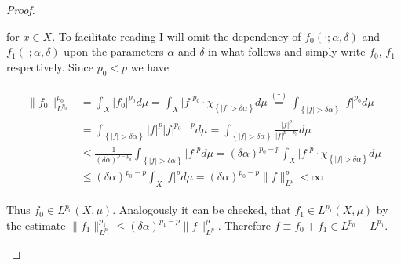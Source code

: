 \begin{proof}
\begin{enumerate}[label = \textbf{(\roman*.)}]
\begin{enumerate}[label = \textbf{\alph*.}]
	for $x \in X$. To facilitate reading I will omit the dependency of $f_0(\cdot;\alpha,\delta)$ and $f_1(\cdot;\alpha,\delta)$ upon the parameters $\alpha$ and $\delta$ in what follows and simply write $f_0$, $f_1$ respectively. Since $p_0 < p$ we have 

	\begin{gather}
		\begin{aligned}
			\|f_0\|^{p_0}_{L^{p_0}} &= \int_{X} \vert f_0\vert^{p_0} d\mu =\int_{X} \vert f \vert^{p_0} \cdot \chi_{\left\{\vert f\vert > \delta\alpha \right\}} d\mu \overset{(\dagger)}{=} \int_{\left\{\vert f \vert > \delta\alpha \right\}} \vert f \vert^{p_0}d\mu\\ 
			&= \int_{\left\{\vert f\vert > \delta\alpha \right\}} \vert f \vert^p \vert f \vert^{p_0 - p} d\mu = \int_{\left\{\vert f\vert > \delta\alpha \right\}} \frac{\vert f \vert^p}{\vert f \vert^{p - p_0}} d\mu\\
			&\leqslant \frac{1}{(\delta\alpha)^{p - p_0}} \int_{\left\{\vert f\vert > \delta\alpha \right\}} \vert f \vert^p d\mu = (\delta\alpha)^{p_0 - p} \int_{X} \vert f \vert^p \cdot \chi_{\left\{\vert f\vert > \delta\alpha \right\}} d\mu\\
			& \leqslant (\delta\alpha)^{p_0 - p} \int_{X} \vert f \vert^p d\mu = (\delta\alpha)^{p_0 - p} \|f\|^p_{L^p} < \infty
		\end{aligned}
		\label{est:f0}
	\end{gather}

	Thus $f_0 \in L^{p_0}(X,\mu)$. Analogously it can be checked, that $f_1 \in L^{p_1}(X,\mu)$ by the estimate $\|f_1\|^{p_1}_{L^{p_1}} \leqslant (\delta\alpha)^{p_1 - p}\|f\|_{L^p}^p$. Therefore $f \equiv f_0 + f_1 \in L^{p_0} + L^{p_1}$.\\
	

\end{enumerate}
\end{enumerate}
\end{proof}
